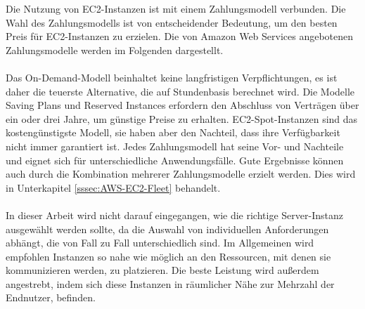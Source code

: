 Die Nutzung von EC2-Instanzen ist mit einem Zahlungsmodell verbunden. Die Wahl des Zahlungsmodells ist von entscheidender Bedeutung, um den besten Preis für EC2-Instanzen zu erzielen.
Die von Amazon Web Services angebotenen Zahlungsmodelle werden im Folgenden dargestellt.
\\\\
Das On-Demand-Modell beinhaltet keine langfristigen Verpflichtungen, es ist daher die teuerste Alternative, die auf Stundenbasis berechnet wird. Die Modelle Saving Plans und Reserved Instances erfordern den Abschluss von Verträgen über ein oder drei Jahre, um günstige Preise zu erhalten. EC2-Spot-Instanzen sind das kostengünstigste Modell, sie haben aber den Nachteil, dass ihre Verfügbarkeit nicht immer garantiert ist. Jedes Zahlungsmodell hat seine Vor- und Nachteile und eignet sich für unterschiedliche Anwendungsfälle. Gute Ergebnisse können auch durch die Kombination mehrerer Zahlungsmodelle erzielt werden. %
Dies wird in Unterkapitel \ref{sssec:AWS-EC2-Fleet} behandelt.
\\\\
In dieser Arbeit wird nicht darauf eingegangen, wie die richtige Server-Instanz ausgewählt werden sollte, da die Auswahl von individuellen Anforderungen abhängt, die von Fall zu Fall unterschiedlich sind. Im Allgemeinen wird empfohlen Instanzen so nahe wie möglich an den Ressourcen, mit denen sie kommunizieren werden, zu platzieren. %
Die beste Leistung wird außerdem angestrebt, indem sich diese Instanzen in räumlicher Nähe zur Mehrzahl der Endnutzer, befinden. 
